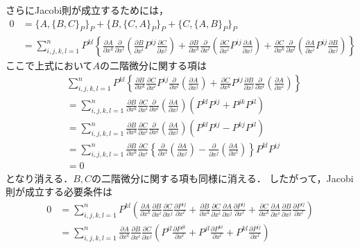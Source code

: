 \documentclass[dvipdfmx,12pt,a4paper,uplatex]{jsarticle}
\theoremstyle{plain}
\theoremstyle{definition}
\begin{document}
さらにJacobi則が成立するためには，
\begin{align}
0
&=
\{A,\{B,C\}_{P}\}_{P} 
+ \{B,\{C,A\}_{P}\}_{P} + \{C,\{A,B\}_{P}\}_{P} \nonumber \\
&=
\sum_{i,j,k,l=1}^n P^{kl}
\left\{
\frac{\partial A}{\partial x^k}
\frac{\partial}{\partial x^l}
\left(
\frac{\partial B}{\partial x^i} P^{ij}
\frac{\partial C}{\partial x^j}
\right)
+
\frac{\partial B}{\partial x^k}
\frac{\partial}{\partial x^l}
\left(
\frac{\partial C}{\partial x^i} P^{ij}
\frac{\partial A}{\partial x^j}
\right)
+
\frac{\partial C}{\partial x^k}
\frac{\partial}{\partial x^l}
\left(
\frac{\partial A}{\partial x^i} P^{ij}
\frac{\partial B}{\partial x^j}
\right)
\right\}  
\end{align}
ここで上式において$A$の二階微分に関する項は
\begin{align}
&\sum_{i,j,k,l=1}^n P^{kl}
\left\{
\frac{\partial B}{\partial x^k}
\frac{\partial C}{\partial x^i} P^{ij}
\frac{\partial}{\partial x^l}
\left(
\frac{\partial A}{\partial x^j}
\right)
+
\frac{\partial C}{\partial x^k}
P^{ij}
\frac{\partial B}{\partial x^j}
\frac{\partial}{\partial x^l}
\left(
\frac{\partial A}{\partial x^i} 
\right)
\right\} \nonumber \\
&=
\sum_{i,j,k,l=1}^n 
\frac{\partial B}{\partial x^k}
\frac{\partial C}{\partial x^i}
\frac{\partial}{\partial x^l}
\left(
\frac{\partial A}{\partial x^j}
\right)
\left(
P^{kl}P^{ij} + P^{jk}P^{il}
\right) \nonumber \\
&=
\sum_{i,j,k,l=1}^n 
\frac{\partial B}{\partial x^k}
\frac{\partial C}{\partial x^i}
\frac{\partial}{\partial x^l}
\left(
\frac{\partial A}{\partial x^j}
\right)
\left(
P^{kl}P^{ij} - P^{kj}P^{il}
\right) \nonumber \\
&=
\sum_{i,j,k,l=1}^n 
\frac{\partial B}{\partial x^k}
\frac{\partial C}{\partial x^i}
\left\{
\frac{\partial}{\partial x^l}
\left(
\frac{\partial A}{\partial x^j}
\right)
-
\frac{\partial}{\partial x^j}
\left(
\frac{\partial A}{\partial x^l}
\right)
\right\}
P^{kl}P^{ij}
\nonumber \\
&=0
\end{align}
となり消える．$B,C$の二階微分に関する項も同様に消える．
したがって，Jacobi則が成立する必要条件は
\begin{align}
0 
&=
\sum_{i,j,k,l=1}^n P^{kl}
\left(
\frac{\partial A}{\partial x^k}
\frac{\partial B}{\partial x^i}
\frac{\partial C}{\partial x^j}
\frac{\partial  P^{ij}}{\partial x^l}
+
\frac{\partial B}{\partial x^k}
\frac{\partial C}{\partial x^i}
\frac{\partial A}{\partial x^j}
\frac{\partial  P^{ij}}{\partial x^l}
+
\frac{\partial C}{\partial x^k}
\frac{\partial A}{\partial x^i}
\frac{\partial B}{\partial x^j}
\frac{\partial  P^{ij}}{\partial x^l}
\right)  \nonumber \\
&=
\sum_{i,j,k,l=1}^n 
\frac{\partial A}{\partial x^k}
\frac{\partial B}{\partial x^i}
\frac{\partial C}{\partial x^j}
\left(
P^{il}\frac{\partial  P^{jk}}{\partial x^l}
+
P^{jl}\frac{\partial  P^{ki}}{\partial x^l}
+
P^{kl}\frac{\partial  P^{ij}}{\partial x^l}
\right)
\end{align}
\end{document}
